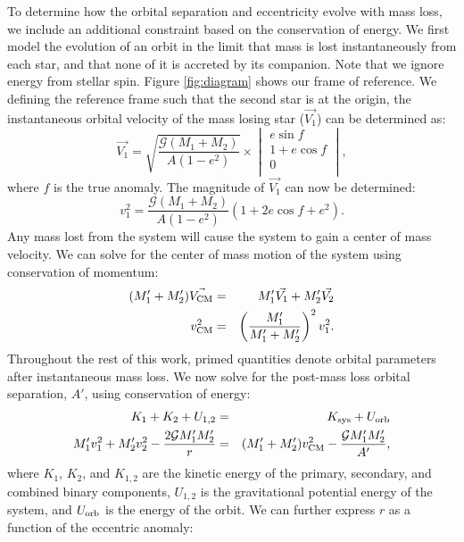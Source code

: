\documentclass{emulateapj}
\begin{document}
To determine how the orbital separation and eccentricity evolve with mass loss, we include an additional constraint based on the conservation of energy. We first model the evolution of an orbit in the limit that mass is lost instantaneously from each star, and that none of it is accreted by its companion. Note that we ignore energy from stellar spin. Figure \ref{fig:diagram} shows our frame of reference. We defining the reference frame such that the second star is at the origin, the instantaneous orbital velocity of the mass losing star ($\vec{V_1}$) can be determined as:
\begin{equation}
\vec{V_1} =   \sqrt{\frac{\mathcal{G} (M_1 + M_2) }{A (1-e^2)}} \times
  \begin{vmatrix}
     e \sin f \\
    1 + e \cos f \\
    0 \\        
  \end{vmatrix} ,
\end{equation}
where $f$ is the true anomaly. The magnitude of $\vec{V_1}$ can now be determined:
\begin{equation}
v_1^2 = \frac{\mathcal{G} (M_1 + M_2) }{A (1-e^2)}(1 + 2 e \cos f + e^2). \label{eq:v_1}
\end{equation}
Any mass lost from the system will cause the system to gain a center of mass velocity. We can solve for the center of mass motion of the system using conservation of momentum:
\begin{eqnarray}
(M_1' + M_2') \vec{V_{\rm CM}} &=& M_1' \vec{V_1} + M_2' \vec{V_2} \nonumber \\
v_{\rm CM}^2 &=& \left( \frac{M_1'}{M_1' + M_2'} \right)^2 v_1^2. \label{eq:v1_vcm}
\end{eqnarray}
Throughout the rest of this work, primed quantities denote orbital parameters after instantaneous mass loss. We now solve for the post-mass loss orbital separation, $A'$, using conservation of energy:
\begin{eqnarray}
K_1 + K_2 + U_{1,2} &=& K_{\rm sys} + U_{\rm orb} \nonumber \\
M_1' v_1^2 + M_2' v_2^2 - \frac{2 \mathcal{G} M_1' M_2'}{r} &=& (M_1' + M_2') v_{\rm CM}^2 - \frac{\mathcal{G} M_1' M_2'}{A'},\label{eq:energy_cons}
\end{eqnarray}
where $K_1$, $K_2$, and $K_{1,2}$ are the kinetic energy of the primary, secondary, and combined binary components, $U_{1,2}$ is the gravitational potential energy of the system, and $U_{\rm orb}$ is the energy of the orbit. We can further express $r$ as a function of the eccentric anomaly:
\end{document}
